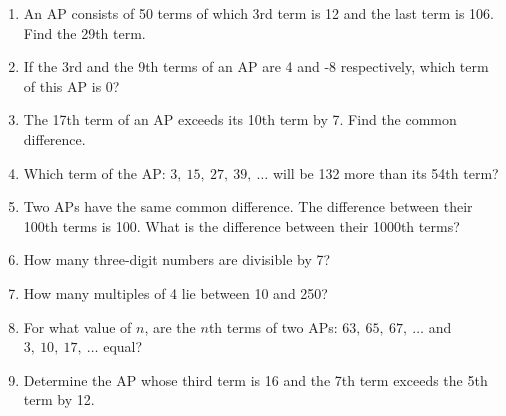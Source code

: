 \documentclass[12pt]{article}
\begin{document}
\begin{enumerate}
\item An AP consists of 50 terms of which 3rd term is 12 and the last term is 106. Find the 29th term.

\item If the 3rd and the 9th terms of an AP are 4 and -8 respectively, which term of this AP is 0?

\item  The 17th term of an AP exceeds its 10th term by 7. Find the common difference.

\item Which term of the AP: \( 3,\ 15,\ 27,\ 39,\ \ldots \) will be 132 more than its 54th term?




\item Two APs have the same common difference. The difference between their 100th terms is 100. What is the difference between their 1000th terms?
\item How many three-digit numbers are divisible by 7?


\item How many multiples of 4 lie between 10 and 250?

\item For what value of \( n \), are the \( n \)th terms of two APs: \( 63,\ 65,\ 67,\ \ldots \) and \( 3,\ 10,\ 17,\ \ldots \) equal?


\item  Determine the AP whose third term is 16 and the 7th term exceeds the 5th term by 12.

\end{enumerate}
\end{document}
